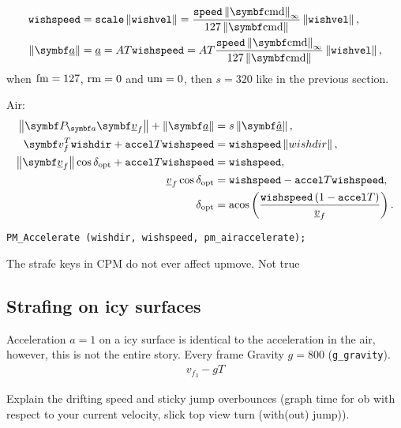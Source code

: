\begin{align*}
\texttt{wishspeed} &= \texttt{scale} \norm{\texttt{wishvel}} =
\frac{\texttt{speed}\norm{\vec{\cmd}}_{\infty}}{127\norm{\vec{\cmd}}} \norm{\texttt{wishvel}},\\
\norm{\vec{\flat{a}}} &= \flat{a} = AT \texttt{wishspeed} = AT\frac{\texttt{speed}\norm{\vec{\cmd}}_{\infty}}{127\norm{\vec{\cmd}}} \norm{\texttt{wishvel}},
\end{align*}
when $\operatorname{fm} = 127$, $\operatorname{rm} = 0$ and $\operatorname{um} = 0$, then $s = 320$ like in the previous section.

Air:
\begin{align}
\nonumber
\norm{\projmat{a} \vec{\flat{v}}_f} + \norm{\vec{\flat{a}}} &= s \norm{\uvec{\flat{a}}},\\
\nonumber
\vec{v}_{f}^T\texttt{wishdir} + \texttt{accel}T\texttt{wishspeed} &= \texttt{wishspeed}\norm{wishdir},\\
\nonumber
\norm{\vec{\flat{v}}_f} \cos{\delta_{\opt}} + \texttt{accel}T\texttt{wishspeed} &= \texttt{wishspeed},\\
\nonumber
\flat{v}_f \cos{\delta_{\opt}} &= \texttt{wishspeed} - \texttt{accel}T\texttt{wishspeed},\\
\delta_{\opt} &= \acos\left( \frac{\texttt{wishspeed} \left(1 - \texttt{accel}T\right)}{\flat{v}_f} \right).
\end{align}

\texttt{PM\_Accelerate (wishdir, wishspeed, pm\_airaccelerate);}

The strafe keys in CPM do not ever affect upmove. Not true


\subsection{Strafing on icy surfaces}
\label{sec:icy}
Acceleration $a = 1$ on a icy surface is identical to the acceleration in the air, however, this is not the entire story. Every frame Gravity $g = 800$ (\texttt{g\_gravity}).
\begin{align*}
v_{f_3} - gT
\end{align*}

Explain the drifting speed and sticky jump overbounces (graph time for ob with respect to your current velocity, slick top view turn (with(out) jump)).


